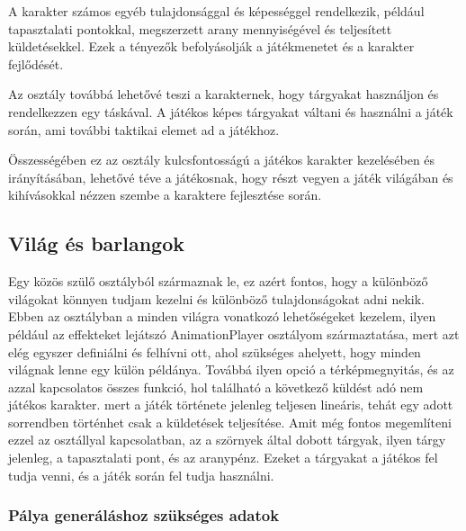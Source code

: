 A karakter számos egyéb tulajdonsággal és képességgel rendelkezik, például tapasztalati pontokkal, megszerzett arany mennyiségével és teljesített küldetésekkel. Ezek a tényezők befolyásolják a játékmenetet és a karakter fejlődését.

Az osztály továbbá lehetővé teszi a karakternek, hogy tárgyakat használjon és rendelkezzen egy táskával. A játékos képes tárgyakat váltani és használni a játék során, ami további taktikai elemet ad a játékhoz.

Összességében ez az osztály kulcsfontosságú a játékos karakter kezelésében és irányításában, lehetővé téve a játékosnak, hogy részt vegyen a játék világában és kihívásokkal nézzen szembe a karaktere fejlesztése során.
\subsection{Világ és barlangok}

\indent \indent Egy közös szülő osztályból származnak le, ez azért fontos, hogy a különböző világokat könnyen tudjam kezelni és különböző tulajdonságokat adni nekik. Ebben az osztályban a minden világra vonatkozó lehetőségeket kezelem, ilyen például az effekteket lejátszó AnimationPlayer osztályom származtatása, mert azt elég egyszer definiálni és felhívni ott, ahol szükséges ahelyett, hogy minden világnak lenne egy külön példánya. Továbbá ilyen opció a térképmegnyitás, és az azzal kapcsolatos összes funkció, hol található a következő küldést adó nem játékos karakter. mert a játék története jelenleg teljesen lineáris, tehát egy adott sorrendben történhet csak a küldetések teljesítése. Amit még fontos megemlíteni ezzel az osztállyal kapcsolatban, az a szörnyek által dobott tárgyak, ilyen tárgy jelenleg, a tapasztalati pont, és az aranypénz. Ezeket a tárgyakat a játékos fel tudja venni, és a játék során fel tudja használni.  

\subsubsection{Pálya generáláshoz szükséges adatok}

